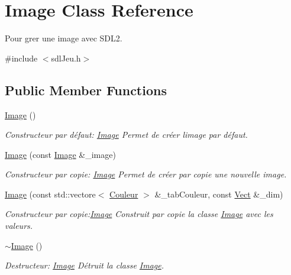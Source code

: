 \hypertarget{classImage}{}\section{Image Class Reference}
\label{classImage}


Pour grer une image avec S\+D\+L2.  




{\ttfamily \#include $<$sdl\+Jeu.\+h$>$}

\subsection*{Public Member Functions}
\begin{DoxyCompactItemize}
\item 
\hyperlink{classImage_a58edd1c45b4faeb5f789b0d036d02313}{Image} ()
\begin{DoxyCompactList}\small\item\em Constructeur par défaut\+: \hyperlink{classImage}{Image} Permet de créer l\textquotesingle{}image par défaut. \end{DoxyCompactList}\item 
\hyperlink{classImage_a18dba28d7d81f51cabf37e0044bd2d6c}{Image} (const \hyperlink{classImage}{Image} \&\+\_\+image)
\begin{DoxyCompactList}\small\item\em Constructeur par copie\+: \hyperlink{classImage}{Image} Permet de créer par copie une nouvelle image. \end{DoxyCompactList}\item 
\hyperlink{classImage_ae8b4bc2d9cf6b0591f9c16829e0b1dad}{Image} (const std\+::vectore$<$ \hyperlink{classCouleur}{Couleur} $>$ \&\+\_\+tab\+Couleur, const \hyperlink{classVect}{Vect} \&\+\_\+dim)
\begin{DoxyCompactList}\small\item\em Constructeur par copie\+:\hyperlink{classImage}{Image} Construit par copie la classe \hyperlink{classImage}{Image} avec les valeurs. \end{DoxyCompactList}\item 
\mbox{\label{classImage_a0294f63700543e11c0f0da85601c7ae5}} 
\hyperlink{classImage_a0294f63700543e11c0f0da85601c7ae5}{$\sim$\+Image} ()
\begin{DoxyCompactList}\small\item\em Destructeur\+: \hyperlink{classImage}{Image} Détruit la classe \hyperlink{classImage}{Image}. \end{DoxyCompactList}\item 

\end{DoxyCompactItemize}
